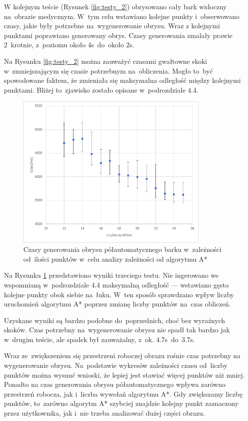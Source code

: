 \documentclass[a4paper,11pt,twoside,openright]{report}
\theoremstyle{definition}
\begin{document}
\bigskip

W kolejnym teście (Rysunek \ref{fig:testy_2}) obrysowano
cały bark widoczny na~obrazie medycznym. W~tym celu wstawiano kolejne
punkty i~obserwowano czasy, jakie były potrzebne na~wygenerowanie obrysu. Wraz z
kolejnymi punktami poprawiano generowany obrys. Czasy generowania zmalały prawie 2~krotnie, z~poziomu
około 4s~do~około 2s.


Na Rysunku \ref{fig:testy_2} można zauważyć czasami gwałtowne skoki w~zmniejszającym
się czasie potrzebnym na~obliczenia. Mogło to~być spowodowane faktem, że zmieniała
się maksymalna odległość między kolejnymi punktami. Bliżej to~zjawisko zostało
opisane w~podrozdziale 4.4.

\begin{figure}[h!]
	\center
	\includegraphics[width=0.85\textwidth]{150}
	\caption{Czasy generowania obrysu półautomatycznego barku w~zależności od~ilości punktów
	w~celu analizy zależności od algorytmu A*}
    	\label{fig:testy_3}
\end{figure}

Na Rysunku \ref{fig:testy_3} przedstawiono wyniki trzeciego testu. Nie ingerowano
we wspomnianą w~podrozdziale 4.4 maksymalną odległość --- wstawiano gęsto kolejne
punkty obok siebie na~łuku. W~ten sposób sprawdzano wpływ liczby uruchomień
algorytmu A* poprzez zmianę liczby punktów na~czas obliczeń.

Uzyskane wyniki są bardzo podobne do~poprzednich, choć bez wyraźnych skoków.
Czas potrzebny na~wygenerowanie obrysu nie spadł tak bardzo jak w~drugim teście,
ale spadek był zauważalny, z~ok. 4.7s~do~3.7s.

Wraz ze~zwiększeniem się przestrzeni roboczej obrazu rośnie czas potrzebny na
wygenerowanie obrysu. Na~podstawie wykresów zależności czasu od~liczby punktów
można wysnuć wnioski, że lepiej jest stawiać więcej punktów niż mniej. Ponadto na czas generowania
obrysu półautomatycznego wpływa zarówno przestrzeń robocza, jak i~liczba wywołań algorytmu A*. Gdy zwiększamy
liczbę punktów, to~zarówno algorytm A* szybciej znajdzie kolejny punkt zaznaczony przez użytkownika, jak i~nie
trzeba analizować dużej części obrazu.
\end{document}
